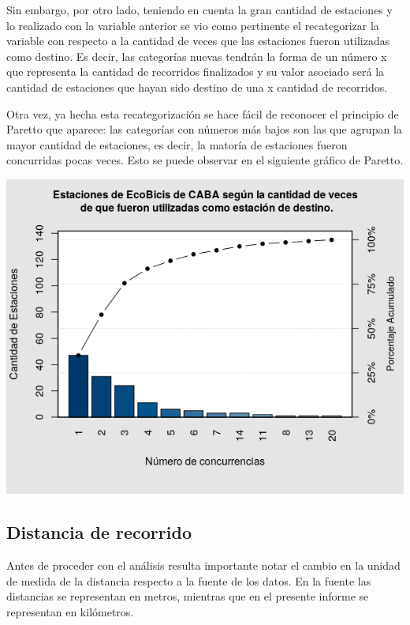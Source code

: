 \documentclass[11pt]{article}
\begin{document}
    
    Sin embargo, por otro lado, teniendo en cuenta la gran cantidad de estaciones y lo realizado con la variable anterior se vio como pertinente el recategorizar la variable 
    con respecto a la cantidad de veces que las estaciones fueron utilizadas como destino. Es decir, las categor\'ias nuevas tendr\'an la forma de un n\'umero x que representa 
    la cantidad de recorridos finalizados y su valor asociado ser\'a la cantidad de estaciones que hayan sido destino de una x cantidad de recorridos. 

    Otra vez, ya hecha esta recategorizaci\'on se hace f\'acil de reconocer el principio de Paretto que aparece: las categor\'ias con n\'umeros m\'as bajos son las que 
    agrupan la mayor cantidad de estaciones, es decir, la mator\'ia de estaciones fueron concurridas pocas veces. Esto se puede observar en el siguiente gr\'afico de Paretto. 

    \begin{center}
      \includegraphics[scale=0.7]{ParettoDest.png}
    \end{center}

    \subsection{Distancia de recorrido}

    Antes de proceder con el an\'alisis resulta importante notar el cambio en la unidad 
    de medida de la distancia respecto a la fuente de los datos. En la fuente las distancias 
    se representan en metros, mientras que en el presente informe se representan en kil\'ometros. 
\end{document}
